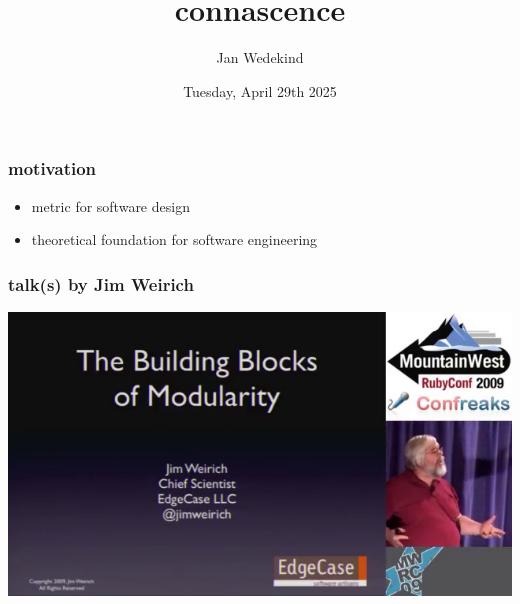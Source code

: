 \documentclass[aspectratio=169,12pt,xcolor=dvipsnames]{beamer}
\title{connascence}
\author{Jan Wedekind}
\date{Tuesday, April 29th 2025}
\begin{document}
\begin{frame}
  \titlepage
\end{frame}

\begin{frame}
  \frametitle{motivation}
  \begin{itemize}
    \item metric for software design
    \item theoretical foundation for software engineering
  \end{itemize}
\end{frame}

\begin{frame}
  \frametitle{talk(s) by Jim Weirich}
  \begin{center}
    \href{https://www.youtube.com/watch?v=q85rdBMe9GY}{\includegraphics[height=.8\textheight]{weirich}}
  \end{center}
\end{frame}
\end{document}
